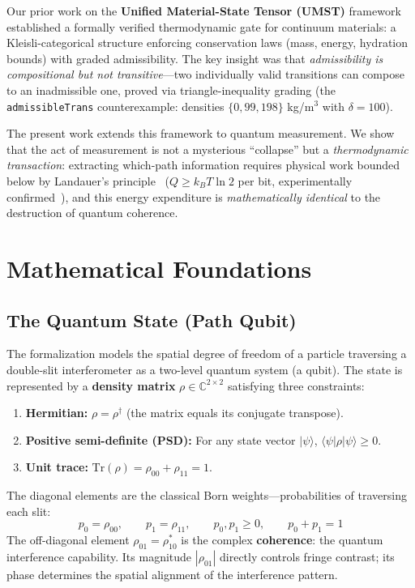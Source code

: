\documentclass[11pt, a4paper]{article}
\begin{document}
Our prior work on the \textbf{Unified Material-State Tensor (UMST)} framework~\cite{umst-formal, fcpI, fcpII} established a formally verified thermodynamic gate for continuum materials: a Kleisli-categorical structure enforcing conservation laws (mass, energy, hydration bounds) with graded admissibility. The key insight was that \emph{admissibility is compositional but not transitive}---two individually valid transitions can compose to an inadmissible one, proved via triangle-inequality grading (the \texttt{admissibleTrans} counterexample: densities $\{0, 99, 198\}$ kg/m$^3$ with $\delta = 100$).

The present work extends this framework to quantum measurement. We show that the act of measurement is not a mysterious ``collapse'' but a \emph{thermodynamic transaction}: extracting which-path information requires physical work bounded below by Landauer's principle~\cite{landauer1961, bennett1982} ($Q \ge k_B T \ln 2$ per bit, experimentally confirmed~\cite{berut2012}), and this energy expenditure is \emph{mathematically identical} to the destruction of quantum coherence.

\section{Mathematical Foundations}

\subsection{The Quantum State (Path Qubit)}

The formalization models the spatial degree of freedom of a particle traversing a double-slit interferometer as a two-level quantum system (a qubit). The state is represented by a \textbf{density matrix} $\rho \in \mathbb{C}^{2 \times 2}$ satisfying three constraints:

\begin{enumerate}
\item \textbf{Hermitian:} $\rho = \rho^\dagger$ (the matrix equals its conjugate transpose).
\item \textbf{Positive semi-definite (PSD):} For any state vector $|\psi\rangle$, $\langle \psi | \rho | \psi \rangle \ge 0$.
\item \textbf{Unit trace:} $\mathrm{Tr}(\rho) = \rho_{00} + \rho_{11} = 1$.
\end{enumerate}

The diagonal elements are the classical Born weights---probabilities of traversing each slit:
\[
p_0 = \rho_{00}, \qquad p_1 = \rho_{11}, \qquad p_0, p_1 \ge 0, \qquad p_0 + p_1 = 1
\]
The off-diagonal element $\rho_{01} = \rho_{10}^*$ is the complex \textbf{coherence}: the quantum interference capability. Its magnitude $|\rho_{01}|$ directly controls fringe contrast; its phase determines the spatial alignment of the interference pattern.
\end{document}
